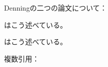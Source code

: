 \documentclass{ltjarticle}
\begin{document}
Denningの二つの論文について：

\cite{Denning2022} はこう述べている。

\cite{Denning2022a} はこう述べている。

複数引用：\cite{Denning2022, Denning2022a}

\printbibliography
\end{document}
